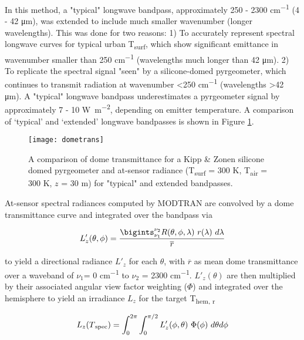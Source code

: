 \begin{bibunit}
In this method, a "typical" longwave bandpass, approximately 250 - 2300 \si{\centi\meter^{-1}} (4 - 42 \si{\micro\meter}), was extended to include much smaller wavenumber (longer wavelengths). This was done for two reasons: 1) To accurately represent spectral longwave curves for typical urban T\textsubscript{surf}, which show significant emittance in wavenumber smaller than 250 \si{cm^{-1}} (wavelengths much longer than 42 \si{\micro\meter}). 2) To replicate the spectral signal "seen" by a silicone-domed pyrgeometer, which continues to transmit radiation at wavenumber \textless 250 \si{cm^{-1}} (wavelengths \textgreater 42 \si{\micro\meter}). A "typical" longwave bandpass underestimates a pyrgeometer signal by approximately 7 - 10 \si{\watt\per\square\meter}, depending on emitter temperature. A comparison of ‘typical’ and ‘extended’ longwave bandpasses is shown in Figure \ref{dometrans}.

\begin{figure}[H]
	\texttt{[image: dometrans]}
	\caption{A comparison of dome transmittance for a Kipp \& Zonen silicone domed pyrgeometer and at-sensor radiance (T\textsubscript{surf} = 300 \si{K}, T\textsubscript{air} = 300 \si{K}, $z$ = 30 \si{m})  for "typical" and extended bandpasses.}
	\label{dometrans}
\end{figure}

At-sensor spectral radiances computed by MODTRAN are convolved by a dome transmittance curve and integrated over the bandpass via 

\begin{equation}
\label{work1}
	L'_z (\theta, \phi) = \frac{\bigints_{\nu_1}^{\nu_2} R(\theta, \phi, \lambda) ~ r(\lambda) ~ d\lambda}{\overline{r}}
\end{equation}

\noindent to yield a directional radiance $ L'_z $ for each $\theta$, with $\overline{r}$ as mean dome transmittance over a waveband of $\nu_1 $= 0 \si{cm^{-1}} to $\nu_2$ = 2300 \si{cm^{-1}}. $ L'_z (\theta) $ are then multiplied by their associated angular view factor weighting ($\Phi$) and integrated over the hemisphere to yield an irradiance $ L_z $ for the target T\textsubscript{hem, r}

\begin{equation}
\label{work2}
	L_z (T\textsubscript{spec}) = \int_{0}^{2\pi}\int_{0}^{\pi/2} L'_z (\phi, \theta) ~ \Phi (\phi) ~ d\theta d\phi
\end{equation}


\end{bibunit}
